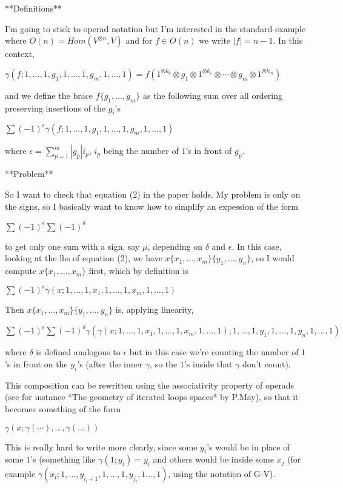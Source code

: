 \documentclass[twoside]{article}
\begin{document}
**Definitions**

I'm going to stick to operad notation but I'm interested in the standard example where $O(n)=Hom(V^{\otimes n},V)$ and for $f\in O(n)$ we write $|f|=n-1$. In this context, 

$\gamma(f;1,\dots,1,g_1,1,\dots, 1, g_m,1,\dots, 1)=f(1^{\otimes k_0}\otimes g_1\otimes 1^{\otimes k_1}\otimes\cdots\otimes g_m\otimes 1^{\otimes k_m})$

and we define the brace $f\{g_1,\dots,g_m\}$ as the following sum over all ordering preserving insertions of the $g_i$'s

$\sum (-1)^\epsilon \gamma(f;1,\dots,1,g_1,1,\dots, 1, g_m,1,\dots, 1)$

where $\epsilon=\sum_{p=1}^m|g_p|i_p$, $i_p$ being the number of $1$'s in front of $g_p$.

**Problem**

So I want to check that equation (2) in the paper holds. My problem is only on the signs, so I basically want to know how to simplify an expession of the form

$\sum (-1)^\epsilon\sum (-1)^\delta$

to get only one sum with a sign, say $\mu$, depending on $\delta$ and $\epsilon$. In this case, looking at the lhs of equation (2), we have $x\{x_1,\dots, x_m\}\{y_1,\dots, y_n\}$, so I would compute $x\{x_1,\dots, x_m\}$ first, which by definition is

$\sum (-1)^\epsilon \gamma(x;1,\dots,1,x_1,1,\dots, 1, x_m,1,\dots, 1)$

Then $x\{x_1,\dots, x_m\}\{y_1,\dots, y_n\}$ is, applying linearity, 

$\sum (-1)^\epsilon \sum(-1)^\delta\gamma(\gamma(x;1,\dots,1,x_1,1,\dots, 1, x_m,1,\dots, 1); 1,\dots, 1,y_1,1,\dots,1,y_n,1,\dots,1)$

where $\delta$ is defined analogous to $\epsilon$ but in this case we're counting the number of $1$'s in front on the $y_i$'s (after the inner $\gamma$, so the $1$'s inside that $\gamma$ don't count).

This composition can be rewritten using the associativity property of operads (see for instance *The geometry of iterated loops spaces* by P.May), so that it becomes something of the form

$\gamma(x;\gamma(\cdots),\dots, \gamma(\dots))$

This is really hard to write more clearly, since some $y_i$'s would be in place of some $1$'s (something like $\gamma(1;y_i)=y_i$ and others would be inside some $x_j$ (for example $\gamma(x_l;1,\dots, y_{i_l+1}, 1,\dots, 1,y_{j_l},1\dots,1)$, using the notation of G-V).
\end{document}
